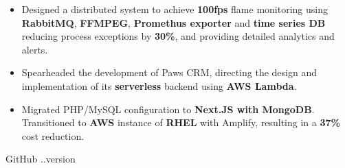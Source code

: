 \documentclass[10pt,a4paper,ragged2e]{classes/altacv}
\begin{document}
\vspace{3pt}

\begin{itemize}[itemsep=5pt]
\normalsize

\item Designed a distributed system to achieve \textbf{100fps} flame monitoring using \textbf{RabbitMQ}, \textbf{FFMPEG}, \textbf{Promethus exporter} and \textbf{time series DB} reducing process exceptions by \textbf{30\%}, and providing detailed analytics and alerts.

\end{itemize}



\divider
{}

\begin{itemize}[itemsep=6pt]
\normalsize

\item Spearheaded the development of Paws CRM, directing the design and implementation of its \textbf{serverless} backend using \textbf{AWS Lambda}.

\end{itemize}
\vspace{3pt}
\begin{itemize}[itemsep=6pt]
\normalsize
\item Migrated PHP/MySQL configuration to \textbf{Next.JS with MongoDB}. Transitioned to \textbf{AWS} instance of \textbf{RHEL} with
Amplify, resulting in a \textbf{37\%} cost reduction.
\end{itemize}

\smallskip
\begin{footnotesize}
GitHub \number \month .\number\year.version
\end{footnotesize}
\clearpage
\end{document}
